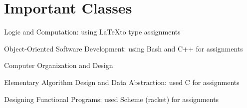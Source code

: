 \documentclass[]{formatting}
\begin{document}
%
%


\sectionsep


\noindent
\begin{minipage}[c]{13cm}
\section{Important Classes}
\vskip5pt
\begin{tightemize}
\item Logic and Computation: using \LaTeX to type assignments
\item Object-Oriented Software Development: using Bash and C++ for assignments
\item Computer Organization and Design
\end{tightemize}
\begin{tightemize}
\item Elementary Algorithm Design and Data Abstraction: used C for assignments
\item Designing Functional Programs: used Scheme (racket) for assignments
\end{tightemize}

\end{minipage} %
\end{document}
